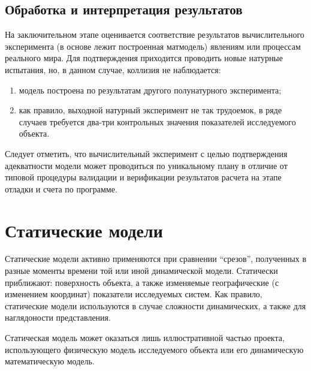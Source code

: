 \documentclass[12pt]{article}
\begin{document}
\subsection{Обработка и интерпретация результатов}
На заключительном этапе оценивается соответствие результатов вычислительного эксперимента (в основе лежит построенная матмодель) явлениям или процессам реального мира. Для подтверждения приходится проводить новые натурные испытания, но, в данном случае, коллизия не наблюдается:

\begin{enumerate}
    \item модель построена по результатам другого полунатурного эксперимента;
    \item как правило, выходной натурный эксперимент не так трудоемок, в ряде случаев требуется два-три контрольных значения показателей исследуемого объекта.
\end{enumerate}

Следует отметить, что вычислительный эксперимент с целью подтверждения адекватности модели может проводиться по уникальному плану в отличие от типовой процедуры валидации и верификации результатов расчета на этапе отладки и счета по программе.

\newpage
\section{Статические модели}
Статические модели активно применяются при сравнении \enquote{срезов}, полученных в разные моменты времени той или иной динамической модели. Статически приближают: поверхность объекта, а также изменяемые географические (с изменением координат) показатели исследуемых систем. Как правило, статические модели используются в случае сложности динамических, а также для наглядоности представления.

Статическая модель может оказаться лишь иллюстративной частью проекта, использующего физическую модель исследуемого объекта или его динамическую математическую модель.
\end{document}
